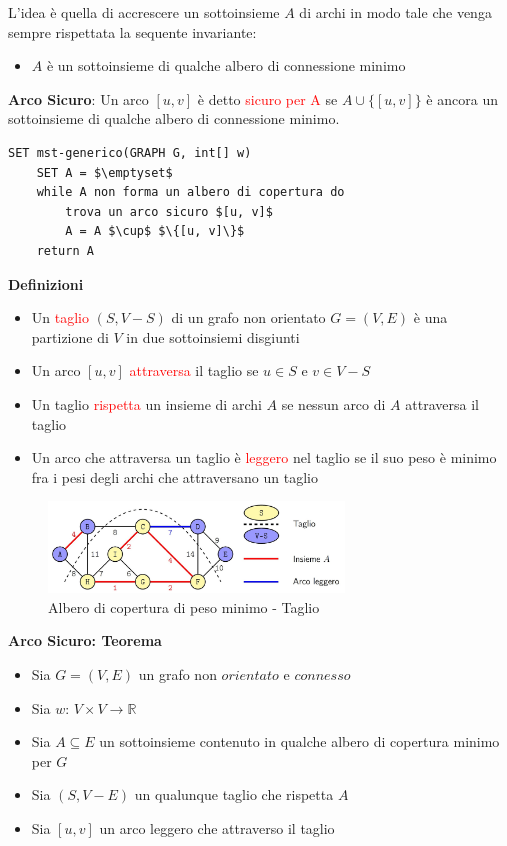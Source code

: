 \documentclass[../cheatSheetAlgoritmi.tex]{subfiles}
\begin{document}
L'idea è quella di accrescere un sottoinsieme $A$ di archi in modo tale che venga sempre rispettata la sequente invariante:
\begin{itemize}
	\item $A$ è un sottoinsieme di qualche albero di connessione minimo
\end{itemize}
\textbf{Arco Sicuro}: Un arco $[u, v]$ è detto \textcolor{red}{sicuro per A} se $A \cup \{[u,v]\}$ è ancora un sottoinsieme di qualche albero di connessione minimo.
\begin{lstlisting}[caption=Algoritmo Generico MST]
SET mst-generico(GRAPH G, int[] w)
	SET A = $\emptyset$
	while A non forma un albero di copertura do
		trova un arco sicuro $[u, v]$
		A = A $\cup$ $\{[u, v]\}$
	return A
\end{lstlisting}
\newpage
\begin{flushleft}
\textbf{Definizioni}
\end{flushleft}
\begin{itemize}
	\item Un \textcolor{red}{taglio} $(S, V - S)$ di un grafo non orientato $G = (V, E)$ è una partizione di $V$ in due sottoinsiemi disgiunti
	\item Un arco $[u, v]$ \textcolor{red}{attraversa} il taglio se $u \in S$ e $v \in V - S$
	\item Un taglio \textcolor{red}{rispetta} un insieme di archi $A$ se nessun arco di $A$ attraversa il taglio
	\item Un arco che attraversa un taglio è \textcolor{red}{leggero} nel taglio se il suo peso è minimo fra i pesi degli archi che attraversano un taglio
\end{itemize}
\begin{figure}[h]
	\centering
	\includegraphics[width=0.7\textwidth]{../img/Greedy_4.jpg}
	\caption{Albero di copertura di peso minimo - Taglio}
\end{figure}
\textbf{Arco Sicuro: Teorema}
\begin{itemize}
	\item Sia $G = (V, E)$ un grafo non $orientato$ e $connesso$
	\item Sia $w$: $V \times V \rightarrow \mathbb{R}$
	\item Sia $A \subseteq E$ un sottoinsieme contenuto in qualche albero di copertura minimo per $G$
	\item Sia $(S, V - E)$ un qualunque taglio che rispetta $A$
	\item Sia $[u, v]$ un arco leggero che attraverso il taglio
\end{itemize}
\end{document}
